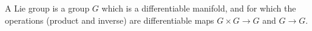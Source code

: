 A Lie group is a group $G$ which is a differentiable manifold, and for which the operations (product and inverse) are differentiable maps $G \times G \to G$ and $G \to G$.
